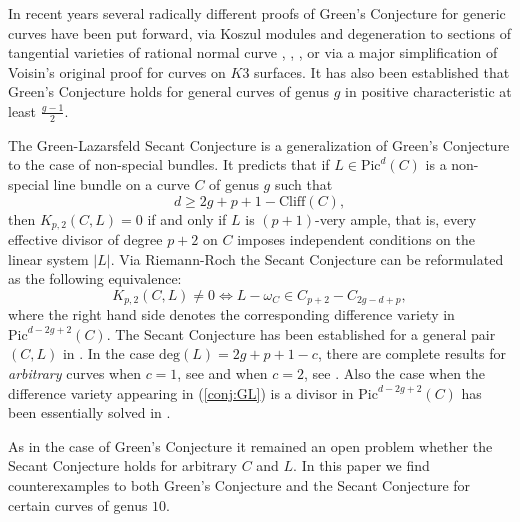 \documentclass[11pt]{amsart}
\theoremstyle{definition}
\begin{document}
\vskip 4pt

In recent years several radically different proofs of Green's Conjecture for generic curves have been put forward, via Koszul modules and degeneration to sections of tangential varieties of rational normal curve \cite{AFPRW}, \cite{Pa}, \cite{RS}, or via a major simplification \cite{K} of Voisin's original proof for curves on $K3$ surfaces. It has also been established that Green's Conjecture holds for general curves of genus $g$ in positive characteristic at least $\frac{g-1}{2}$. 

\vskip 4pt


 The Green-Lazarsfeld Secant Conjecture \cite{GL} is a generalization of Green's Conjecture to the case of non-special bundles.  It predicts that if $L\in \mbox{Pic}^d(C)$ is a non-special line bundle on a curve $C$ of genus $g$ such that
\begin{equation}\label{ineq:gl}
d\geq 2g+p+1-\mbox{Cliff}(C),
\end{equation}
then $K_{p,2}(C,L)= 0$ if and only if $L$ is $(p+1)$-very ample, that is, every effective divisor of degree $p+2$ on $C$
imposes independent conditions on the linear system $|L|$. Via Riemann-Roch the Secant Conjecture can be reformulated as the following equivalence:
\begin{equation}\label{conj:GL}
K_{p,2}(C,L)\neq 0\Longleftrightarrow L-\omega_C\in C_{p+2}-C_{2g-d+p},
\end{equation}
where the right hand side denotes the corresponding difference variety in $\mbox{Pic}^{d-2g+2}(C).$
The Secant Conjecture has been established for a general pair $(C,L)$ in
\cite[Theorem 1.3]{FK}. In the case $\mbox{deg}(L)=2g+p+1-c$, there are complete results for \emph{arbitrary} curves when $c=1$, see \cite[Theorem 2]{GL} and when $c=2$, see  \cite{Ag}. Also the case when the difference variety appearing in (\ref{conj:GL}) is a divisor in $\mbox{Pic}^{d-2g+2}(C)$ has been essentially solved in \cite{F}. 

\vskip 4pt

As in the case of Green's Conjecture it remained an open problem whether the Secant Conjecture holds for arbitrary $C$ and $L$. In this paper we find counterexamples to both Green's Conjecture and the Secant Conjecture for certain curves of genus $10$. 

\vskip 5pt
\end{document}
